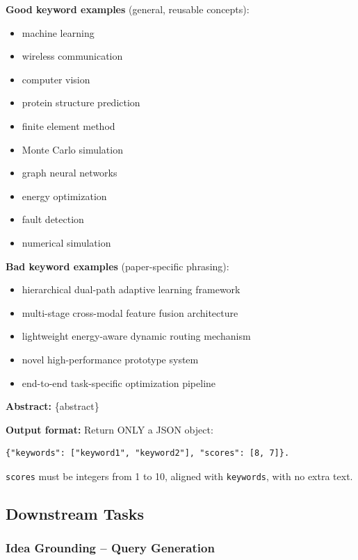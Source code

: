 \documentclass{llmxive}
\begin{document}
\begin{tcolorbox}[breakable, colback=black!5!white, colframe=black!60!black,
  left=1ex, right=1ex, top=0.5ex, bottom=0.5ex,
  fontupper=\small\ttfamily, fontlower=\small\ttfamily,
  title=\textbf{Keyword Extraction}]
\textbf{Good keyword examples} (general, reusable concepts):
\begin{itemize}\small
\item machine learning
\item wireless communication
\item computer vision
\item protein structure prediction
\item finite element method
\item Monte Carlo simulation
\item graph neural networks
\item energy optimization
\item fault detection
\item numerical simulation
\end{itemize}

\textbf{Bad keyword examples} (paper-specific phrasing):
\begin{itemize}\small
\item hierarchical dual-path adaptive learning framework
\item multi-stage cross-modal feature fusion architecture
\item lightweight energy-aware dynamic routing mechanism
\item novel high-performance prototype system
\item end-to-end task-specific optimization pipeline
\end{itemize}

\textbf{Abstract:}
\{abstract\}

\textbf{Output format:}
Return ONLY a JSON object:
\begin{verbatim}
{"keywords": ["keyword1", "keyword2"], "scores": [8, 7]}.
\end{verbatim}
\texttt{scores} must be integers from 1 to 10, aligned with \texttt{keywords}, with no extra text.
\end{tcolorbox}

\subsection{Downstream Tasks}
\label{app:prompt_downstream}

\subsubsection{Idea Grounding -- Query Generation}
\label{prompt:task1-query-gen}
\end{document}
